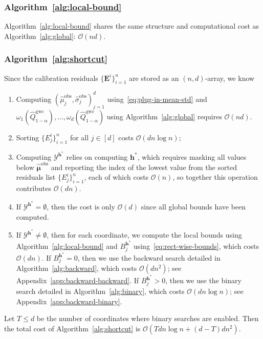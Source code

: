 \subsubsection{Algorithm~\ref{alg:local-bound}}
\label{app:lwc-local-bound}

Algorithm~\ref{alg:local-bound} shares the same structure and computational cost as Algorithm~\ref{alg:global}: $\mathcal O(nd)$.

\subsubsection{Algorithm~\ref{alg:shortcut}}
\label{app:lwc-sc-cost}
Since the calibration residuals $\{\mathbf{E}^i\}_{i=1}^{n}$ are stored as an $(n,d)$-array, we know
\begin{enumerate}
    \item Computing $(\hat\mu^{\mathrm{obs}}_j,\hat\sigma^{\mathrm{obs}}_j)_{j=1}^d$ using~\eqref{eq:plug-in-mean-std} and $\omega_1(\hat{Q}^{\mathrm{gwc}}_{1-\alpha}),\ldots,\omega_d(\hat{Q}^{\mathrm{gwc}}_{1-\alpha})$ using Algorithm~\ref{alg:global} requires $\mathcal O(nd)$.
    \item Sorting $\{E^i_j\}^n_{i=1}$ for all $j\in [d]$ costs $\mathcal{O}(dn\log{n})$;
    \item Computing $\mathcal{Y}^{\mathbf{h}^*}$ relies on computing $\mathbf{h}^*$, which requires masking all values below $\hat{\boldsymbol\mu}^{\mathrm{obs}}$ and reporting the index of the lowest value from the sorted residuals list $\{E^i_j\}^n_{i=1}$, each of which costs $\mathcal{O}(n)$, so together this operation contributes $\mathcal{O}(dn)$.
    \item If $\mathcal{Y}^{\mathbf{h}^*} = \emptyset$, then the cost is only $\mathcal{O}(d)$ since all global bounds have been computed.
    \item If $\mathcal{Y}^{\mathbf{h}^*} \neq \emptyset$, then for each coordinate, we compute the local bounds using Algorithm~\ref{alg:local-bound} and $B^{\mathbf{h}^*}_j$ using~\eqref{eq:rect-wise-bounds}, which costs $\mathcal{O}(dn)$.
    If $B^{\mathbf{h}^*}_j = 0$, then we use the backward search detailed in Algorithm~\ref{alg:backward}, which costs $\mathcal{O}(dn^2)$; see Appendix~\ref{app:backward-backward}.
    If $B^{\mathbf{h}^*}_j > 0$, then we use the binary search detailed in Algorithm~\ref{alg:binary}, which costs $\mathcal{O}(dn\log{n})$; see Appendix~\ref{app:backward-binary}.
\end{enumerate}  
Let $T \leq d$ be the number of coordinates where binary searches are enabled. Then the total cost of Algorithm~\ref{alg:shortcut} is $\mathcal{O}(Tdn\log{n} + (d-T)dn^2)$.

